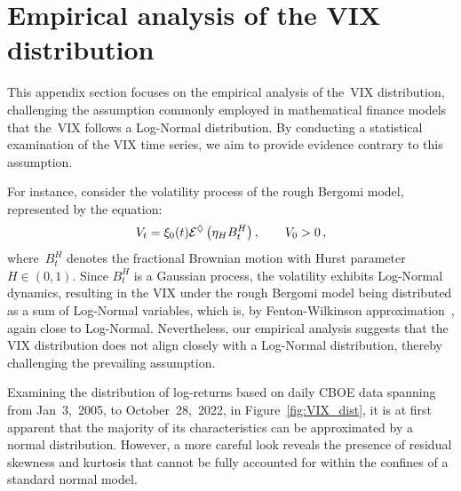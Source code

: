 \section{Empirical analysis of the VIX distribution}\label{apx:VIX_smile_rBergomi}

This appendix section focuses on the empirical analysis of the~VIX distribution, challenging the assumption commonly employed in mathematical finance models that the~VIX follows a Log-Normal distribution. By conducting a statistical examination of the VIX time series, we aim to provide evidence contrary to this assumption. 

For instance, consider the volatility process of the rough Bergomi model, represented by the equation:
\[
V_t = \xi_0(t) \mathcal{E}^\lozenge\left(\eta_H B_t^{H}\right), \qquad V_0>0\,,
\]
where~$B_t^{H}$ denotes the fractional Brownian motion with Hurst parameter $H\in(0,1)$. Since $B_t^{H}$ is a Gaussian process, the volatility exhibits Log-Normal dynamics, resulting in the VIX under the rough Bergomi model being distributed as a sum of Log-Normal variables, which is, by Fenton-Wilkinson approximation~\cite{Fenton1960TheSystems}, again close to Log-Normal. Nevertheless, our empirical analysis suggests that the VIX distribution does not align closely with a Log-Normal distribution, thereby challenging the prevailing assumption.

Examining the distribution of log-returns based on daily CBOE data spanning from Jan~3,~2005, to October~28,~2022, in Figure~\ref{fig:VIX_dist}, it is at first apparent that the majority of its characteristics can be approximated by a normal distribution. However, a more careful look reveals the presence of residual skewness and kurtosis that cannot be fully accounted for within the confines of a standard normal model.

